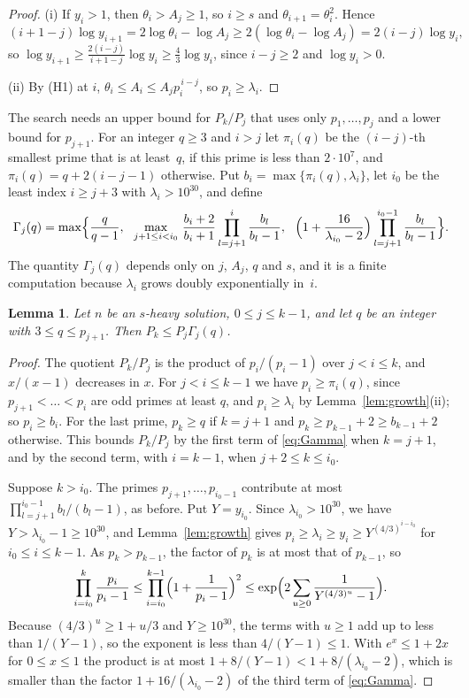 \documentclass[11pt,reqno]{amsart}
\numberwithin{equation}{section}
\theoremstyle{plain}
\newtheorem{lemma}[theorem]{Lemma}
\theoremstyle{definition}
\theoremstyle{remark}
\begin{document}
\begin{proof}
(i) If $y_i>1$, then $\theta_i>A_j\ge1$, so $i\ge s$ and
$\theta_{i+1}=\theta_i^2$. Hence
\[
  (i+1-j)\log y_{i+1}=2\log\theta_i-\log A_j
  \ge2(\log\theta_i-\log A_j)=2(i-j)\log y_i ,
\]
so $\log y_{i+1}\ge\frac{2(i-j)}{i+1-j}\log y_i\ge\frac43\log y_i$,
since $i-j\ge2$ and $\log y_i>0$.

(ii) By (H1) at $i$, $\theta_i\le A_i\le A_jp_i^{\,i-j}$, so
$p_i\ge\lambda_i$.
\end{proof}

The search needs an upper bound for $P_k/P_j$ that uses only
$p_1,\dots,p_j$ and a lower bound for $p_{j+1}$. For an integer
$q\ge3$ and $i>j$ let $\pi_i(q)$ be the $(i-j)$-th smallest prime that
is at least~$q$, if this prime is less than $2\cdot10^7$, and
$\pi_i(q)=q+2(i-j-1)$ otherwise. Put
$b_i=\max\{\pi_i(q),\lambda_i\}$, let $i_0$ be the least index
$i\ge j+3$ with $\lambda_i>10^{30}$, and define
\begin{equation}\label{eq:Gamma}
  \Gamma_j(q)=\max\Bigl\{\frac{q}{q-1},\ \
  \max_{j+1\le i<i_0}\,\frac{b_i+2}{b_i+1}\prod_{l=j+1}^{i}
  \frac{b_l}{b_l-1},\ \
  \Bigl(1+\frac{16}{\lambda_{i_0}-2}\Bigr)\prod_{l=j+1}^{i_0-1}
  \frac{b_l}{b_l-1}\Bigr\}.
\end{equation}
The quantity $\Gamma_j(q)$ depends only on $j$, $A_j$, $q$ and $s$,
and it is a finite computation because $\lambda_i$ grows doubly
exponentially in~$i$.

\begin{lemma}\label{lem:ext}
Let $n$ be an $s$-heavy solution, $0\le j\le k-1$, and let $q$ be an
integer with $3\le q\le p_{j+1}$. Then $P_k\le P_j\Gamma_j(q)$.
\end{lemma}

\begin{proof}
The quotient $P_k/P_j$ is the product of $p_i/(p_i-1)$ over
$j<i\le k$, and $x/(x-1)$ decreases in $x$. For $j<i\le k-1$ we have
$p_i\ge\pi_i(q)$, since $p_{j+1}<\dots<p_i$ are odd primes at least
$q$, and $p_i\ge\lambda_i$ by Lemma~\ref{lem:growth}(ii); so
$p_i\ge b_i$. For the last prime, $p_k\ge q$ if $k=j+1$ and
$p_k\ge p_{k-1}+2\ge b_{k-1}+2$ otherwise. This bounds $P_k/P_j$ by
the first term of \eqref{eq:Gamma} when $k=j+1$, and by the second
term, with $i=k-1$, when $j+2\le k\le i_0$.

Suppose $k>i_0$. The primes $p_{j+1},\dots,p_{i_0-1}$ contribute at
most $\prod_{l=j+1}^{i_0-1}b_l/(b_l-1)$, as before. Put $Y=y_{i_0}$.
Since $\lambda_{i_0}>10^{30}$, we have $Y>\lambda_{i_0}-1\ge10^{30}$,
and Lemma~\ref{lem:growth} gives
$p_i\ge\lambda_i\ge y_i\ge Y^{(4/3)^{i-i_0}}$ for $i_0\le i\le k-1$.
As $p_k>p_{k-1}$, the factor of $p_k$ is at most that of $p_{k-1}$,
so
\[
  \prod_{i=i_0}^{k}\frac{p_i}{p_i-1}
  \le\prod_{i=i_0}^{k-1}\Bigl(1+\frac1{p_i-1}\Bigr)^{2}
  \le\exp\Bigl(2\sum_{u\ge0}\frac1{Y^{(4/3)^u}-1}\Bigr).
\]
Because $(4/3)^u\ge1+u/3$ and $Y\ge10^{30}$, the terms with $u\ge1$
add up to less than $1/(Y-1)$, so the exponent is less than
$4/(Y-1)\le1$. With $e^x\le1+2x$ for $0\le x\le1$ the product is at
most $1+8/(Y-1)<1+8/(\lambda_{i_0}-2)$, which is smaller than the
factor $1+16/(\lambda_{i_0}-2)$ of the third term of \eqref{eq:Gamma}.
\end{proof}
\end{document}
